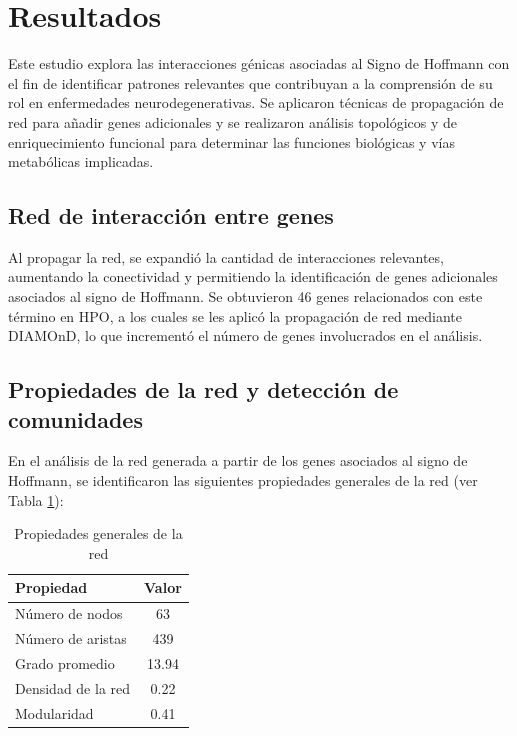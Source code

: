 \section{Resultados}

Este estudio explora las interacciones génicas asociadas al Signo de Hoffmann con el fin de identificar patrones relevantes que contribuyan a la comprensión de su rol en enfermedades neurodegenerativas. Se aplicaron técnicas de propagación de red para añadir genes adicionales y se realizaron análisis topológicos y de enriquecimiento funcional para determinar las funciones biológicas y vías metabólicas implicadas.

\subsection{Red de interacción entre genes}

Al propagar la red, se expandió la cantidad de interacciones relevantes, aumentando la conectividad y permitiendo la identificación de genes adicionales asociados al signo de Hoffmann. Se obtuvieron 46 genes relacionados con este término en HPO, a los cuales se les aplicó la propagación de red mediante DIAMOnD, lo que incrementó el número de genes involucrados en el análisis.


\subsection{Propiedades de la red y detección de comunidades}

En el análisis de la red generada a partir de los genes asociados al signo de Hoffmann, se identificaron las siguientes propiedades generales de la red (ver Tabla \ref{tab:propiedades_red}):

\begin{table}[h!]
	\centering
	\caption{Propiedades generales de la red}
	\label{tab:propiedades_red}
	\begin{tabular}{|l|c|}
		\hline
		\textbf{Propiedad} & \textbf{Valor} \\ \hline
		\hline
		Número de nodos & 63 \\ \hline
		Número de aristas & 439 \\ \hline
		Grado promedio & 13.94 \\ \hline
		Densidad de la red & 0.22 \\ \hline
		Modularidad & 0.41 \\ \hline
	\end{tabular}
\end{table}


